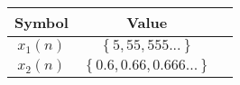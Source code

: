 \begin{tabular}{|c|c|c|}
    \hline
     \textbf{Symbol} & \textbf{Value} \\
    \hline
     $x_1(n)$ & $\left\{5,55,555...\right\}$ \\[6pt]
    \hline
     $x_2(n)$ & $\left\{0.6,0.66,0.666...\right\}$ \\[6pt]
   
     
    \hline
\end{tabular}
